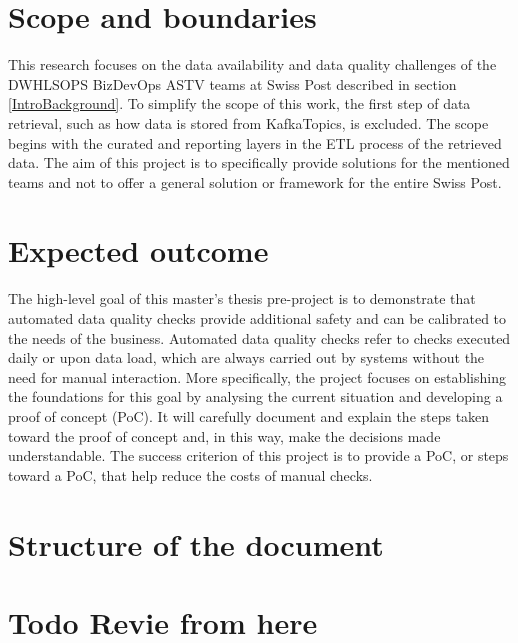 \section{Scope and boundaries}
This research focuses on the data availability and data quality challenges of the \gls{DWHLSOPS} \gls{BizDevOps} \gls{ASTV} teams at Swiss Post described in section \ref{IntroBackground}. To simplify the scope of this work, the first step of data retrieval, such as how data is stored from \gls{KafkaTopics}, is excluded. The scope begins with the curated and reporting layers in the \gls{ETL} process of the retrieved data. The aim of this project is to specifically provide solutions for the mentioned teams and not to offer a general solution or framework for the entire Swiss Post.


\section{Expected outcome}
The high-level goal of this master’s thesis pre-project is to demonstrate that automated data quality checks provide additional safety and can be calibrated to the needs of the business. Automated data quality checks refer to checks executed daily or upon data load, which are always carried out by systems without the need for manual interaction. More specifically, the project focuses on establishing the foundations for this goal by analysing the current situation and developing a proof of concept (\gls{PoC}). It will carefully document and explain the steps taken toward the proof of concept and, in this way, make the decisions made understandable. The success criterion of this project is to provide a PoC, or steps toward a PoC, that help reduce the costs of manual checks.




\section{Structure of the document}

\section{Todo Revie from here}

